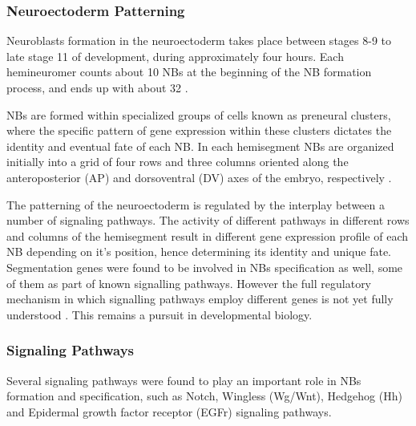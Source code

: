 \subsubsection{Neuroectoderm Patterning}
Neuroblasts formation in the neuroectoderm takes place between stages 8-9 to late stage 11  of development, 
during approximately four hours. Each hemineuromer counts about 10 NBs at the beginning of the NB formation process, 
and ends up with about 32 \cite{Crews2019, Bhat1999, bossing1996embryonic, schmidt1997embryonic}.  

NBs are formed within specialized groups of cells known as preneural clusters, 
where the specific pattern of gene expression within these clusters dictates the identity and eventual fate of each NB. 
In each hemisegment NBs are organized initially into a grid of four rows and three columns oriented along 
the anteroposterior (AP) and dorsoventral (DV) axes of the embryo, respectively \cite{Crews2019, Bhat1999, Skeath1999}.  

The patterning of the neuroectoderm is regulated by the interplay between a number of signaling pathways. 
The activity of different pathways in different rows and columns of the hemisegment result in different gene expression 
profile of each NB depending on it's position, hence determining its identity and unique fate. 
Segmentation genes were found to be involved in NBs specification as well, some of them as part of known signalling pathways. 
However the full regulatory mechanism in which signalling pathways employ different genes is not yet fully understood \cite{Bhat1999}. 
This remains a pursuit in developmental biology.   %

\subsubsection{Signaling Pathways}
Several signaling pathways were found to play an important role in NBs formation and specification, 
such as Notch, Wingless (Wg/Wnt), Hedgehog (Hh) and Epidermal growth factor receptor (EGFr) signaling pathways. 

